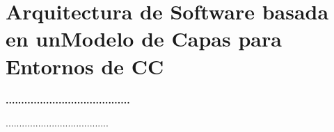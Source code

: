 \section{ Arquitectura de Software basada en unModelo de Capas para Entornos de CC} 
\textbf{........................................}\\
\begin{flushleft}
......................................
\end{flushleft}
